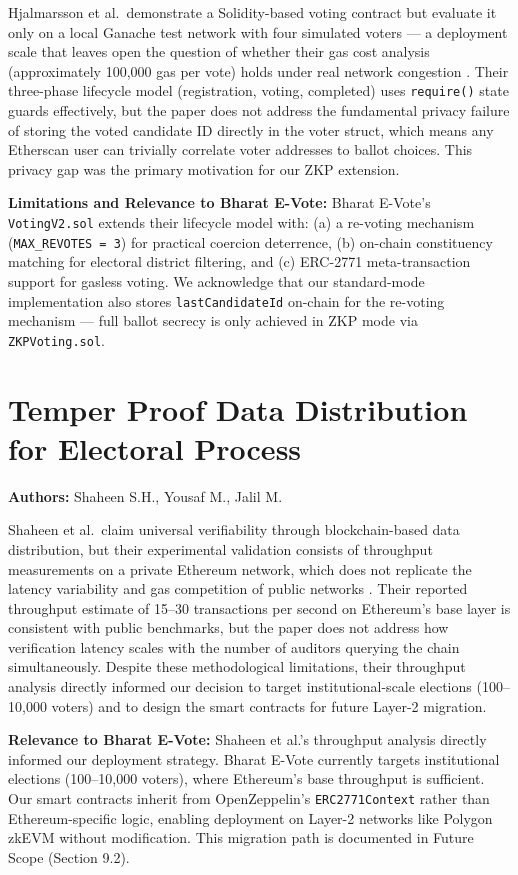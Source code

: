 \documentclass[oneside,a4paper,12pt]{book}
\begin{document}
Hjalmarsson et al.\ demonstrate a Solidity-based voting contract but evaluate it only on a local Ganache test network with four simulated voters --- a deployment scale that leaves open the question of whether their gas cost analysis (approximately 100,000 gas per vote) holds under real network congestion \cite{hjalmarsson2018}. Their three-phase lifecycle model (registration, voting, completed) uses \texttt{require()} state guards effectively, but the paper does not address the fundamental privacy failure of storing the voted candidate ID directly in the voter struct, which means any Etherscan user can trivially correlate voter addresses to ballot choices. This privacy gap was the primary motivation for our ZKP extension.

\textbf{Limitations and Relevance to Bharat E-Vote:} Bharat E-Vote's \texttt{VotingV2.sol} extends their lifecycle model with: (a) a re-voting mechanism (\texttt{MAX\_REVOTES = 3}) for practical coercion deterrence, (b) on-chain constituency matching for electoral district filtering, and (c) ERC-2771 meta-transaction support for gasless voting. We acknowledge that our standard-mode implementation also stores \texttt{lastCandidateId} on-chain for the re-voting mechanism --- full ballot secrecy is only achieved in ZKP mode via \texttt{ZKPVoting.sol}.

\section{Temper Proof Data Distribution for Electoral Process}
\textbf{Authors:} Shaheen S.H., Yousaf M., Jalil M. \cite{shaheen2022}

Shaheen et al.\ claim universal verifiability through blockchain-based data distribution, but their experimental validation consists of throughput measurements on a private Ethereum network, which does not replicate the latency variability and gas competition of public networks \cite{shaheen2022}. Their reported throughput estimate of 15--30 transactions per second on Ethereum's base layer is consistent with public benchmarks, but the paper does not address how verification latency scales with the number of auditors querying the chain simultaneously. Despite these methodological limitations, their throughput analysis directly informed our decision to target institutional-scale elections (100--10,000 voters) and to design the smart contracts for future Layer-2 migration.

\textbf{Relevance to Bharat E-Vote:} Shaheen et al.'s throughput analysis directly informed our deployment strategy. Bharat E-Vote currently targets institutional elections (100--10,000 voters), where Ethereum's base throughput is sufficient. Our smart contracts inherit from OpenZeppelin's \texttt{ERC2771Context} rather than Ethereum-specific logic, enabling deployment on Layer-2 networks like Polygon zkEVM without modification. This migration path is documented in Future Scope (Section 9.2).
\end{document}
